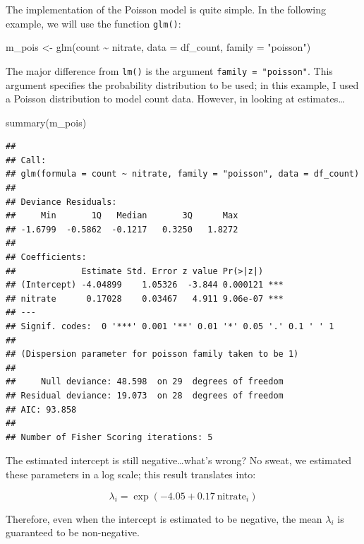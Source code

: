 \documentclass[
]{book}
\newenvironment{Shaded}{\begin{snugshade}}{\end{snugshade}}
\newcommand{\AttributeTok}[1]{\textcolor[rgb]{0.77,0.63,0.00}{#1}}
\newcommand{\FunctionTok}[1]{\textcolor[rgb]{0.00,0.00,0.00}{#1}}
\newcommand{\NormalTok}[1]{#1}
\newcommand{\OtherTok}[1]{\textcolor[rgb]{0.56,0.35,0.01}{#1}}
\newcommand{\SpecialCharTok}[1]{\textcolor[rgb]{0.00,0.00,0.00}{#1}}
\newcommand{\StringTok}[1]{\textcolor[rgb]{0.31,0.60,0.02}{#1}}
\begin{document}
The implementation of the Poisson model is quite simple. In the following example, we will use the function \texttt{glm()}:

\begin{Shaded}
\begin{Highlighting}[]
\NormalTok{m\_pois }\OtherTok{\textless{}{-}} \FunctionTok{glm}\NormalTok{(count }\SpecialCharTok{\textasciitilde{}}\NormalTok{ nitrate,}
              \AttributeTok{data =}\NormalTok{ df\_count,}
              \AttributeTok{family =} \StringTok{"poisson"}\NormalTok{)}
\end{Highlighting}
\end{Shaded}

The major difference from \texttt{lm()} is the argument \texttt{family\ =\ "poisson"}. This argument specifies the probability distribution to be used; in this example, I used a Poisson distribution to model count data. However, in looking at estimates\ldots{}

\begin{Shaded}
\begin{Highlighting}[]
\FunctionTok{summary}\NormalTok{(m\_pois)}
\end{Highlighting}
\end{Shaded}

\begin{verbatim}
## 
## Call:
## glm(formula = count ~ nitrate, family = "poisson", data = df_count)
## 
## Deviance Residuals: 
##     Min       1Q   Median       3Q      Max  
## -1.6799  -0.5862  -0.1217   0.3250   1.8272  
## 
## Coefficients:
##             Estimate Std. Error z value Pr(>|z|)    
## (Intercept) -4.04899    1.05326  -3.844 0.000121 ***
## nitrate      0.17028    0.03467   4.911 9.06e-07 ***
## ---
## Signif. codes:  0 '***' 0.001 '**' 0.01 '*' 0.05 '.' 0.1 ' ' 1
## 
## (Dispersion parameter for poisson family taken to be 1)
## 
##     Null deviance: 48.598  on 29  degrees of freedom
## Residual deviance: 19.073  on 28  degrees of freedom
## AIC: 93.858
## 
## Number of Fisher Scoring iterations: 5
\end{verbatim}

The estimated intercept is still negative\ldots what's wrong? No sweat, we estimated these parameters in a log scale; this result translates into:

\[
\lambda_i = \exp(-4.05 + 0.17~\text{nitrate}_i)
\]

Therefore, even when the intercept is estimated to be negative, the mean \(\lambda_i\) is guaranteed to be non-negative.
\end{document}

